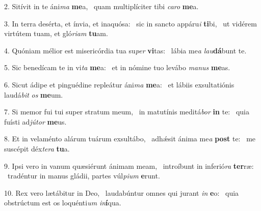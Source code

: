 2. Sitívit in te áni\textit{ma} \textbf{me}a, \ast\  quam multiplíciter tibi \textit{ca}\textit{ro} \textbf{me}a.\

3. In terra desérta, et ínvia, et inaquósa: \dag\  sic in sancto appáru\textit{i} \textbf{ti}bi, \ast\  ut vidérem virtútem tuam, et gló\textit{ri}\textit{am} \textbf{tu}am.\

4. Quóniam mélior est misericórdia tua su\textit{per} \textbf{vi}tas: \ast\  lábia me\textit{a} \textit{lau}\textbf{dá}bunt te.\

5. Sic benedícam te in vi\textit{ta} \textbf{me}a: \ast\  et in nómine tuo levábo \textit{ma}\textit{nus} \textbf{me}as.\

6. Sicut ádipe et pinguédine repleátur áni\textit{ma} \textbf{me}a: \ast\  et lábiis exsultatiónis laudá\textit{bit} \textit{os} \textbf{me}um.\

7. Si memor fui tui super stratum meum, \dag\  in matutínis meditá\textit{bor} \textbf{in} te: \ast\  quia fuísti ad\textit{jú}\textit{tor} \textbf{me}us.\

8. Et in velaménto alárum tuárum exsultábo, \dag\  adhǽsit ánima me\textit{a} \textbf{post} te: \ast\  me suscépit déx\textit{te}\textit{ra} \textbf{tu}a.\

9. Ipsi vero in vanum quæsiérunt ánimam meam, \dag\  introíbunt in inferió\textit{ra} \textbf{ter}ræ: \ast\  tradéntur in manus gládii, partes vúl\textit{pi}\textit{um} \textbf{e}runt.\

10. Rex vero lætábitur in Deo, \dag\  laudabúntur omnes qui jurant \textit{in} \textbf{e}o: \ast\  quia obstrúctum est os loquénti\textit{um} \textit{in}\textbf{í}qua.\

